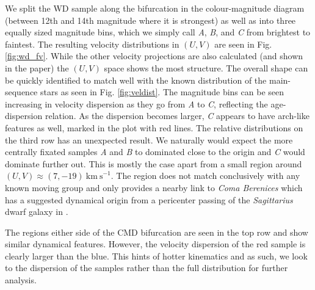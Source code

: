 We split the WD sample along the bifurcation in the colour-magnitude diagram (between 12th and 14th magnitude where it is strongest) as well as into three equally sized magnitude bins, which we simply call \textit{A}, \textit{B}, and \textit{C} from brightest to faintest. The resulting velocity distributions in $(U, V)$ are seen in Fig. \ref{fig:wd_fv}. While the other velocity projections are also calculated (and shown in the paper) the $(U, V)$ space shows the most structure. The overall shape can be quickly identified to match well with the known distribution of the main-sequence stars as seen in Fig. \ref{fig:veldist}. The magnitude bins can be seen increasing in velocity dispersion as they go from \textit{A} to \textit{C}, reflecting the age-dispersion relation. As the dispersion becomes larger, \textit{C} appears to have arch-like features as well, marked in the plot with red lines. The relative distributions on the third row has an unexpected result. We naturally would expect the more centrally fixated samples \textit{A} and \textit{B} to dominated close to the origin and \textit{C} would dominate further out. This is mostly the case apart from a small region around $(U, V) \approx (7, -19)\ \mathrm{km\ s}^{-1}$. The region does not match conclusively with any known moving group and only \cite{kushniruk:17} provides a nearby link to \textit{Coma Berenices} which has a suggested dynamical origin from a pericenter passing of the \textit{Sagittarius} dwarf galaxy in \cite{monari:18}. 

The regions either side of the CMD bifurcation are seen in the top row and show similar dynamical features. However, the velocity dispersion of the red sample is clearly larger than the blue. This hints of hotter kinematics and as such, we look to the dispersion of the samples rather than the full distribution for further analysis. 
